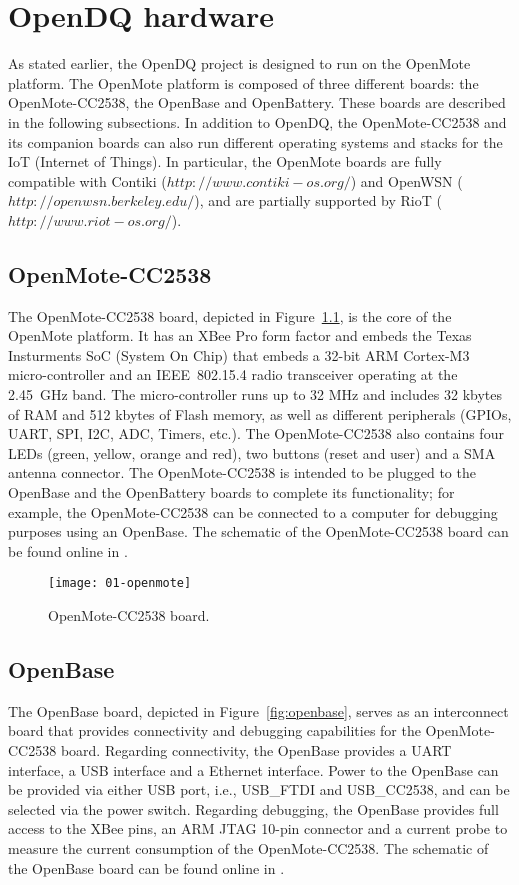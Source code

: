 \chapter{OpenDQ hardware}
\label{sec:02-hardware}
As stated earlier, the OpenDQ project is designed to run on the OpenMote platform. The OpenMote platform is composed of three different boards: the OpenMote-CC2538, the OpenBase and OpenBattery. These boards are described in the following subsections. In addition to OpenDQ, the OpenMote-CC2538 and its companion boards can also run different operating systems and stacks for the IoT (Internet of Things). In particular, the OpenMote boards are fully compatible with Contiki ($http://www.contiki-os.org/$) and OpenWSN ($http://openwsn.berkeley.edu/$), and are partially supported by RioT ($http://www.riot-os.org/$).

\section{OpenMote-CC2538}
The OpenMote-CC2538 board, depicted in Figure~\ref{fig:openmote-cc2538}, is the core of the OpenMote platform. It has an XBee Pro form factor and embeds the Texas Insturments SoC (System On Chip) \cite{cc2538ds, cc2538ug} that embeds a 32-bit ARM Cortex-M3 micro-controller and an IEEE~802.15.4 radio transceiver operating at the 2.45~GHz band. The micro-controller runs up to 32 MHz and includes 32 kbytes of RAM and 512 kbytes of Flash memory, as well as different peripherals (GPIOs, UART, SPI, I2C, ADC, Timers, etc.). The OpenMote-CC2538 also contains four LEDs (green, yellow, orange and red), two buttons (reset and user) and a SMA antenna connector. The OpenMote-CC2538 is intended to be plugged to the OpenBase and the OpenBattery boards to complete its functionality; for example, the OpenMote-CC2538 can be connected to a computer for debugging purposes using an OpenBase. The schematic of the OpenMote-CC2538 board can be found online in \cite{openmote_schematic}.

\begin{figure}[!ht]
    \centering
	\texttt{[image: 01-openmote]}
    \caption{OpenMote-CC2538 board.}
    \label{fig:openmote-cc2538}
\end{figure}

\section{OpenBase}
The OpenBase board, depicted in Figure~\ref{fig:openbase}, serves as an interconnect board that provides connectivity and debugging capabilities for the OpenMote-CC2538 board. Regarding connectivity, the OpenBase provides a UART interface, a USB interface and a Ethernet interface. Power to the OpenBase can be provided via either USB port, i.e., USB\_FTDI and USB\_CC2538, and can be selected via the power switch. Regarding debugging, the OpenBase provides full access to the XBee pins, an ARM JTAG 10-pin connector and a current probe to measure the current consumption of the OpenMote-CC2538. The schematic of the OpenBase board can be found online in \cite{openbase_schematic}.

